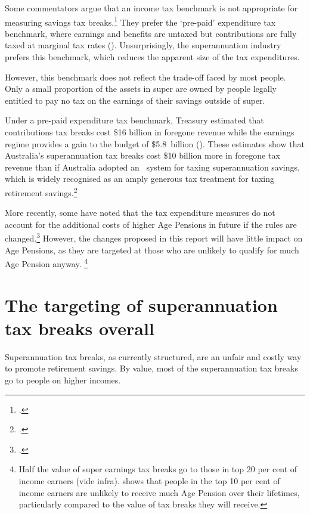Some commentators argue that an income tax benchmark is not appropriate for measuring savings tax breaks.\footcites{Carling2015}{Sloan2015} They prefer the ‘pre-paid’ expenditure tax benchmark, where earnings and benefits are untaxed but contributions are fully taxed at marginal tax rates (). Unsurprisingly, the superannuation industry prefers this benchmark, which reduces the apparent size of the tax expenditures. 

However, this benchmark does not reflect the trade-off faced by most people. Only a small proportion of the assets in super are owned by people legally entitled to pay no tax on the earnings of their savings outside of super. 

Under a pre-paid expenditure tax benchmark, Treasury estimated that contributions tax breaks cost \$16 billion in foregone revenue while the earnings regime provides a gain to the budget of \$5.8~billion (\textcite{Treasury2014TES2013}). These estimates show that Australia’s superannuation tax breaks cost \$10 billion more in foregone tax revenue than if Australia adopted an \EET\ system for taxing superannuation savings, which is widely recognised as an amply generous tax treatment for taxing retirement savings.\footcites{MaddockKing2015}{Freebairn2015}

More recently, some have noted that the tax expenditure measures do not account for the additional costs of higher Age Pensions in future if the rules are changed.\footcites[][5--6]{Mercer2013a}[][13--14]{FSC2015}[][3]{Clare2015}
However, the changes proposed in this report will have little impact on Age Pensions, as they are targeted at those who are unlikely to qualify for much Age Pension anyway.%
\footnote{Half the value of super earnings tax breaks go to those in top 20 per cent of income earners (vide  {infra}).   shows that people in the top 10 per cent of income earners are unlikely to receive much Age Pension over their lifetimes, particularly compared to the value of tax breaks they will receive.}  



\chapter{The targeting of superannuation tax breaks overall}
Superannuation tax breaks, as currently structured, are an unfair and costly way to promote retirement savings. By value, most of the superannuation tax breaks go to people on higher incomes. 

